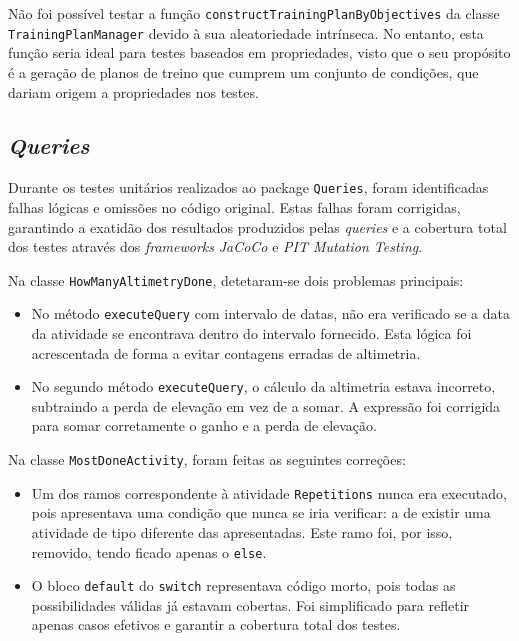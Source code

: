 \documentclass[12pt, a4paper]{article}
\begin{document}
Não foi possível testar a função \texttt{constructTrainingPlanByObjectives} da classe
\texttt{TrainingPlanManager} devido à sua aleatoriedade intrínseca. No entanto, esta função seria
ideal para testes baseados em propriedades, visto que o seu propósito é a geração de planos de
treino que cumprem um conjunto de condições, que dariam origem a propriedades nos testes.

\subsection{\emph{Queries}}

Durante os testes unitários realizados ao package \texttt{Queries}, foram
identificadas falhas lógicas e omissões no código original. Estas falhas foram
corrigidas, garantindo a exatidão dos resultados produzidos pelas
\emph{queries} e a cobertura total dos testes através dos \emph{frameworks}
\emph{JaCoCo} e \emph{PIT Mutation Testing}.

Na classe \texttt{HowManyAltimetryDone}, detetaram-se dois problemas principais:
\begin{itemize}
  \item No método \texttt{executeQuery} com intervalo de datas, não era
        verificado se a data da atividade se encontrava dentro do intervalo
        fornecido. Esta lógica foi acrescentada de forma a evitar contagens
        erradas de altimetria.
  \item No segundo método \texttt{executeQuery}, o cálculo da altimetria estava
        incorreto, subtraindo a perda de elevação em vez de a somar. A expressão
        foi corrigida para somar corretamente o ganho e a perda de elevação.
\end{itemize}

Na classe \texttt{MostDoneActivity}, foram feitas as seguintes correções:
\begin{itemize}
  \item Um dos ramos correspondente à atividade \texttt{Repetitions} nunca era
        executado, pois apresentava uma condição que nunca se iria verificar: a
        de existir uma atividade de tipo diferente das apresentadas. Este ramo
        foi, por isso, removido, tendo ficado apenas o \texttt{else}.
  \item O bloco \texttt{default} do \texttt{switch} representava código morto,
        pois todas as possibilidades válidas já estavam cobertas. Foi
        simplificado para refletir apenas casos efetivos e garantir a cobertura
        total dos testes.
\end{itemize}
\end{document}
